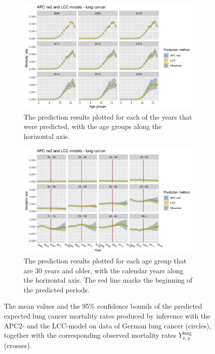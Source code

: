 \begin{figure}
    \centering
    \begin{subfigure}[b]{.75\linewidth}
        \includegraphics[width=\linewidth]{real-data/real-data-univariate/Figures/univariate-comparison-by-age-lung.png}
        \caption{The prediction results plotted for each of the years that were predicted, with the age groups along the horizontal axis.}
        \label{fig:uv-comparison-lung-top}
    \end{subfigure}
    
    \begin{subfigure}[b]{.75\linewidth}
        \includegraphics[width=\linewidth]{real-data/real-data-univariate/Figures/univariate-comparison-by-period-lung.png}
        \caption{The prediction results plotted for each age group that are 30 years and older, with the calendar years along the horizontal axis. The red line marks the beginning of the predicted periods.}
        \label{fig:uv-comparison-lung-bottom}
    \end{subfigure}
    \caption{The mean values and the 95\% confidence bounds of the predicted expected lung cancer mortality rates produced by inference with the APC2- and the LCC-model on data of German lung cancer (circles), together with the corresponding observed mortality rates $Y_{x,y}^{\text{lung}}$ (crosses).}
    \label{fig:uv-comparison-lung}
\end{figure}

